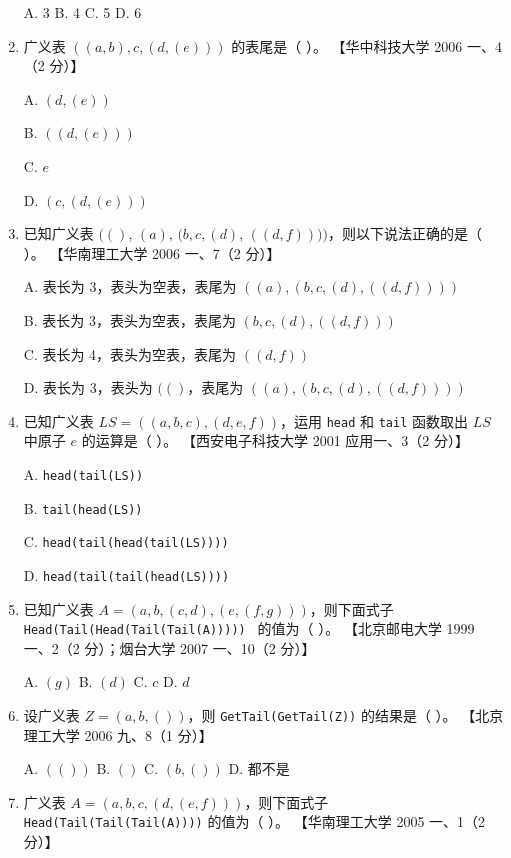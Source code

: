 \documentclass[lang=cn,newtx,10pt,scheme=chinese]{elegantbook}
\begin{document}
\begin{enumerate}
    A. 3 \quad B. 4 \quad C. 5 \quad D. 6  

    \item 广义表 $((a, b), c, (d, (e)))$ 的表尾是（ ）。  
    【华中科技大学 2006 一、4（2 分）】  

    A. $(d, (e))$  

    B. $((d, (e)))$  

    C. $e$  

    D. $(c, (d, (e)))$  

    \item 已知广义表 $(()$, $(a)$, $(b, c, (d)$, $((d, f))))$，则以下说法正确的是（ ）。  
    【华南理工大学 2006 一、7（2 分）】  

    A. 表长为 3，表头为空表，表尾为 $((a), (b, c, (d), ((d, f))))$  

    B. 表长为 3，表头为空表，表尾为 $(b, c, (d), ((d, f)))$  

    C. 表长为 4，表头为空表，表尾为 $((d, f))$  

    D. 表长为 3，表头为 $(()$，表尾为 $((a), (b, c, (d), ((d, f))))$  

    \item 已知广义表 $LS = ((a, b, c), (d, e, f))$，运用 \texttt{head} 和 \texttt{tail} 函数取出 $LS$ 中原子 $e$ 的运算是（ ）。  
    【西安电子科技大学 2001 应用一、3（2 分）】

    A. \texttt{head(tail(LS))}  

    B. \texttt{tail(head(LS))}  

    C. \texttt{head(tail(head(tail(LS))))}  

    D. \texttt{head(tail(tail(head(LS))))}  

    \item 已知广义表 $A = (a, b, (c, d), (e, (f, g)))$，则下面式子 \texttt{Head(Tail(Head(Tail(Tail(A))))) } 的值为（ ）。  
    【北京邮电大学 1999 一、2（2 分）；烟台大学 2007 一、10（2 分）】

    A. $(g)$ \quad B. $(d)$ \quad C. $c$ \quad D. $d$  

    \item 设广义表 $Z = (a, b, ())$，则 \texttt{GetTail(GetTail(Z))} 的结果是（ ）。  
    【北京理工大学 2006 九、8（1 分）】  

    A. $(())$ \quad B. $()$ \quad C. $(b, ())$ \quad D. 都不是  

    \item 广义表 $A = (a, b, c, (d, (e, f)))$，则下面式子 \texttt{Head(Tail(Tail(Tail(A))))} 的值为（ ）。  
    【华南理工大学 2005 一、1（2 分）】  


\end{enumerate}
\end{document}

